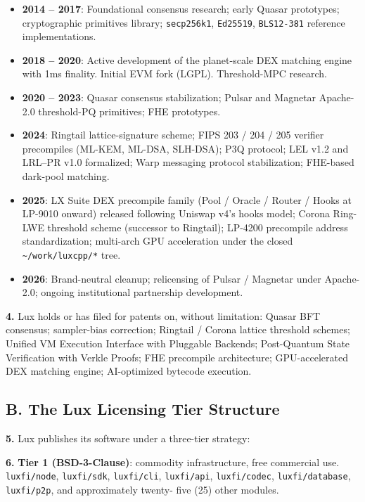 \documentclass[11pt,letterpaper]{article}
\begin{document}
\begin{itemize}[leftmargin=2em,itemsep=0.1em]
\item \textbf{2014 -- 2017}: Foundational consensus research; early
Quasar prototypes; cryptographic primitives library;
\texttt{secp256k1}, \texttt{Ed25519}, \texttt{BLS12-381} reference
implementations.
\item \textbf{2018 -- 2020}: Active development of the planet-scale
DEX matching engine with 1ms finality. Initial EVM fork (LGPL).
Threshold-MPC research.
\item \textbf{2020 -- 2023}: Quasar consensus stabilization; Pulsar
and Magnetar Apache-2.0 threshold-PQ primitives; FHE prototypes.
\item \textbf{2024}: Ringtail lattice-signature scheme; FIPS 203 /
204 / 205 verifier precompiles (ML-KEM, ML-DSA, SLH-DSA); P3Q
protocol; LEL v1.2 and LRL--PR v1.0 formalized; Warp messaging
protocol stabilization; FHE-based dark-pool matching.
\item \textbf{2025}: LX Suite DEX precompile family (Pool / Oracle /
Router / Hooks at LP-9010 onward) released following Uniswap v4's
hooks model; Corona Ring-LWE threshold scheme (successor to Ringtail);
LP-4200 precompile address standardization; multi-arch GPU acceleration
under the closed \texttt{\textasciitilde/work/luxcpp/*} tree.
\item \textbf{2026}: Brand-neutral cleanup; relicensing of Pulsar /
Magnetar under Apache-2.0; ongoing institutional partnership
development.
\end{itemize}

\textbf{4.} Lux holds or has filed for patents on, without limitation:
Quasar BFT consensus; sampler-bias correction; Ringtail / Corona
lattice threshold schemes; Unified VM Execution Interface with
Pluggable Backends; Post-Quantum State Verification with Verkle
Proofs; FHE precompile architecture; GPU-accelerated DEX matching
engine; AI-optimized bytecode execution.

\subsection*{B. The Lux Licensing Tier Structure}

\textbf{5.} Lux publishes its software under a three-tier strategy:

\textbf{6.} \textbf{Tier 1 (BSD-3-Clause)}: commodity infrastructure,
free commercial use. \texttt{luxfi/node}, \texttt{luxfi/sdk},
\texttt{luxfi/cli}, \texttt{luxfi/api}, \texttt{luxfi/codec},
\texttt{luxfi/database}, \texttt{luxfi/p2p}, and approximately twenty-
five (25) other modules.
\end{document}
